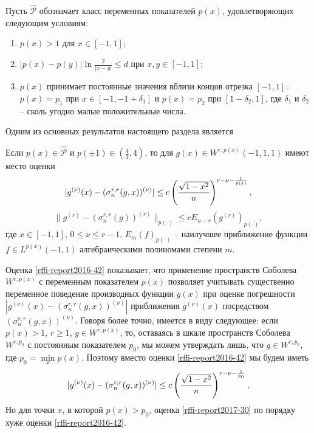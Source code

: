 Пусть $\mathcal{\hat P}$ обозначает класс переменных показателей $p(x)$, удовлетворяющих следующим условиям:
\begin{enumerate}[1)]
\item\label{rffi-report2017-p-cond-1}
$p(x)>1$ для $x\in[-1,1]$;
\item\label{rffi-report2017-p-cond-2}
$|p(x)-p(y)|\ln\frac{2}{|x-y|}\le d$ при $x,y\in[-1,1]$;
\item\label{rffi-report2017-p-cond-3}
$p(x)$  принимает постоянные значения вблизи концов отрезка $[-1,1]$: $p(x)=p_1$ при $x\in[-1,-1+\delta_1]$ и $p(x)=p_2$ при $[1-\delta_2, 1]$, где $\delta_1$ и $\delta_2$ -- сколь угодно малые положительные числа.
\end{enumerate}
Одним из основных результатов настоящего раздела является
\begin{theorem}\label{rffi-report2016-th5}
Если $p(x)\in \mathcal{\hat P}$ и $p(\pm1)\in (\frac43,4)$, то для $g(x)\in W^{r,p(x)}(-1,1,1)$ имеют место оценки
\begin{equation}\label{rffi-report2016-42}
|g^{(\nu)}(x)-(\sigma_n^{r,r}(g,x))^{(\nu)}|\le c\left({\sqrt{1-x^2}\over n}\right)^{r-\nu-\frac{1}{p(x)}} ,
\end{equation}
\begin{equation}\label{rffi-report2017-29}
\|g^{(r)}-(\sigma_n^{r,r}(g))^{(r)}\|_{p(\cdot)}\le cE_{n-r}(g^{(r)})_{p(\cdot)},
\end{equation}
где $ x\in[-1,1]$, $0\le\nu\le r-1$, $E_m(f)_{p(\cdot)}$ -- наилучшее приближение функции $f\in L^{p(x)}(-1,1) $ алгебраическими полиномами степени $m$.
\end{theorem}


Оценка \eqref{rffi-report2016-42} показывает, что применение пространств Соболева  $W^{r,p(x)}$ с переменным показателем $p(x)$ позволяет учитывать существенно переменное поведение производных функции  $g(x)$  при оценке погрешности $|g^{(\nu)}(x)-(\sigma_n^{r,r}(g,x))^{(\nu)}|$ приближения  $g^{(\nu)}(x)$ посредством $(\sigma_n^{r,r}(g,x))^{(\nu)}$. Говоря более точно, имеется в виду следующее: если $p(x)>1$, $r\ge1$, $g\in W^{r,p(x)}$, то, оставаясь в шкале пространств Соболева $W^{r,p_0}$ с постоянным показателем $p_0$, мы можем утверждать лишь, что  $g\in W^{r,p_0}$, где $p_0=\min\limits_x p(x)$. Поэтому вместо оценки \eqref{rffi-report2016-42} мы будем иметь
\begin{equation}\label{rffi-report2017-30}
|g^{(\nu)}(x)-(\sigma_n^{r,r}(g,x))^{(\nu)}|\le c\left({\sqrt{1-x^2}\over n}\right)^{r-\nu-\frac{1}{p_0}} ,
\end{equation}
Но для точки $x$, в которой $p(x)>p_0$, оценка \eqref{rffi-report2017-30}  по порядку хуже оценки \eqref{rffi-report2016-42}.

